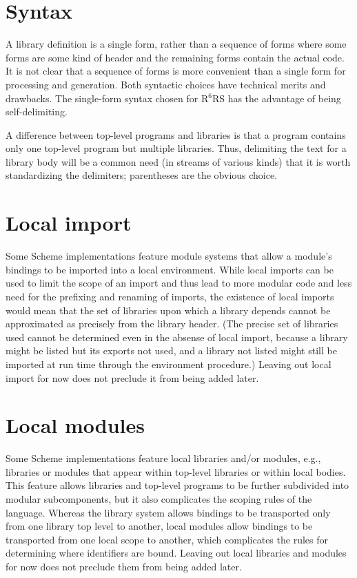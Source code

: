 \documentclass[twoside,twocolumn]{algol60}
\newcommand{\rn}[1]{R$^{#1}$RS}
\begin{document}
\section{Syntax}

A library definition is a single form, rather than a sequence of forms
where some forms are some kind of header and the remaining forms
contain the actual code.
It is not clear that a sequence of forms is more convenient than a
single form for processing and generation. Both syntactic choices have
technical merits and drawbacks. The single-form syntax chosen for
\rn{6} has the advantage of being self-delimiting.

A difference between top-level programs and libraries is that a
program contains only one top-level program but multiple libraries.
Thus, delimiting the text for a library body will be a
common need (in streams of various kinds) that it is worth
standardizing the delimiters; parentheses are the obvious choice.

\section{Local import}
\label{localimportsection}

Some Scheme implementations feature module systems that allow a
module's bindings to be imported into a local environment.  While local
imports can be used to limit the scope of an import and thus lead to more
modular code and less need for the prefixing and renaming of imports,
the existence of local imports would mean that the set of libraries upon
which a library depends cannot be approximated as precisely from the
library header.
(The precise set of libraries used
cannot be determined even in the absense of local import,
because a library might be listed but its exports not used, and a library
not listed might still be imported at run time through the {\cf
environment} procedure.)
Leaving out local import for now does not preclude it from being added
later.

\section{Local modules}

Some Scheme implementations feature local libraries and/or modules, e.g.,
libraries or modules that appear within top-level libraries or within
local bodies.
This feature allows libraries and top-level programs to be further
subdivided into modular subcomponents, but it also complicates the scoping
rules of the language.
Whereas the library system allows bindings to be transported only from one
library top level to another, local modules allow bindings to be
transported from one local scope to another, which complicates the rules
for determining where identifiers are bound.
Leaving out local libraries and modules for now does
not preclude them from being added later.
\end{document}
